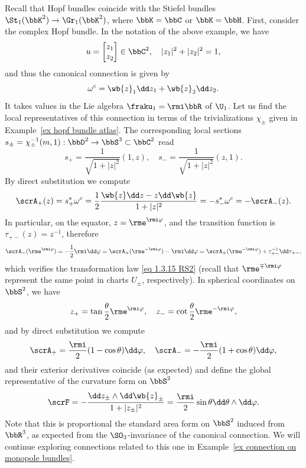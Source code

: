 \begin{example}\label{ex connection on Hopf bundle}
    Recall that Hopf bundles coincide with the Stiefel bundles $\St_1(\bbK^2)\to \Gr_1(\bbK^2)$, where $\bbK=\bbC$ or $\bbK=\bbH$. First, consider the complex Hopf bundle. In the notation of the above example, we have
    \[u=\begin{bmatrix}
        z_1\\z_2
    \end{bmatrix}
    \in\bbC^2,\quad |z_1|^2+|z_2|^2=1,\]
    and thus the canonical connection is given by
    \[\omega^c=\wb{z}_1\dd z_1+\wb{z}_2\dd z_2.\]
    It takes values in the Lie algebra $\fraku_1=\rmi \bbR$ of $\U_1$. Let us find the local representatives of this connection in terms of the trivializations $\chi_\pm$ given in Example~\ref{ex hopf bundle atlas}. The corresponding local sections $s_\pm=\chi^{-1}_\pm(m,1):\bbD^2\to \bbS^3\subset\bbC^2$ read
    \[s_+=\frac{1}{\sqrt{1+|z|^2}}(1,z),\quad s_-=\frac{1}{\sqrt{1+|z|^2}}(z,1).\]
    By direct substitution we compute
    \[\scrA_+(z)=s_+^\ast \omega^c=\frac12\frac{\wb{z}\dd z-z\dd \wb{z}}{1+|z|^2}=-s_-^\ast\omega^c=-\scrA_-(z).\]
    In particular, on the equator, $z=\rme^{\rmi \varphi}$, and the transition function is $\tau_{+-}(z)=z^{-1}$, therefore
    \[\scrA_-(\rme^{\rmi \varphi})=-\frac12\rmi \dd\varphi=\scrA_+(\rme^{-\rmi \varphi})-\rmi\dd\varphi=\scrA_+(\rme^{-\rmi \varphi})+\tau_{+-}^{-1}\dd\tau_{+-},\]
    which verifies the transformation law \eqref{eq 1.3.15 RS2} (recall that $\rme^{\mp\rmi \varphi}$ represent the same point in charts $U_\pm$, respectively). In spherical coordinates on $\bbS^2$, we have \[z_+=\tan\frac{\theta}{2}\rme^{\rmi\varphi}, \quad z_-=\cot\frac{\theta}{2}\rme^{-\rmi\varphi},\]
    and by direct substitution we compute
    \[\scrA_+=\frac{\rmi}{2}(1-\cos\theta)\dd\varphi,\quad \scrA_-=-\frac{\rmi}{2}(1+\cos\theta)\dd\varphi,\]
    and their exterior derivatives coincide (as expected) and define the global representative of the curvature form on $\bbS^2$
    \[\scrF=-\frac{\dd z_\pm\wedge \dd\wb{z}_\pm}{1+|z_\pm|^2}=\frac{\rmi}{2}\sin\theta \dd\theta\wedge\dd\varphi.\]
    Note that this is proportional the standard area form on $\bbS^2$ induced from $\bbR^3$, as expected from the $\SO_3$-invariance of the canonical connection.
    We will continue exploring connections related to this one in Example~\ref{ex connection on monopole bundles}.


\end{example}
